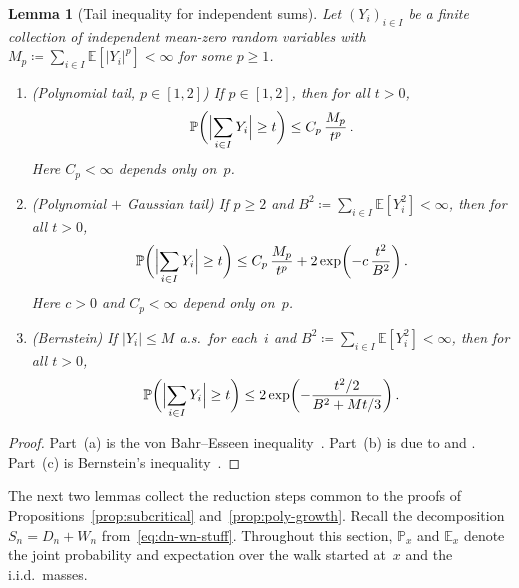 \documentclass[aop]{imsart}
\theoremstyle{plain}
\newtheorem{lemma}[theorem]{Lemma}
\theoremstyle{definition}
\newcommand{\E}{\mathbb{E}}
\renewcommand{\P}{\mathbb{P}}
\begin{document}
	\begin{lemma}[Tail inequality for independent sums]\label{lem:fuk-nagaev}
		Let $(Y_i)_{i\in I}$ be a finite collection of independent mean-zero random variables with $M_p\coloneqq\sum_{i\in I}\E[|Y_i|^p]<\infty$ for some $p\geq 1$.
		\begin{enumerate}[label=\textup{(\alph*)}]
			\item \textup{(Polynomial tail, $p\in[1,2]$)}\; If $p\in[1,2]$, then for all $t>0$,
			\begin{equation}\label{eq:poly-tail}
				\P\biggl(\Bigl|\sum_{i\in I}Y_i\Bigr|\geq t\biggr)\leq C_p\,\frac{M_p}{t^p}\,.
			\end{equation}
			Here $C_p<\infty$ depends only on~$p$.
			\item \textup{(Polynomial $+$ Gaussian tail)}\; If $p\geq 2$ and $B^2\coloneqq\sum_{i\in I}\E[Y_i^2]<\infty$, then for all $t>0$,
			\begin{equation}\label{eq:fuk-nagaev}
				\P\biggl(\Bigl|\sum_{i\in I}Y_i\Bigr|\geq t\biggr)\leq C_p\,\frac{M_p}{t^p}+2\exp\biggl(-c\,\frac{t^2}{B^2}\biggr)\,.
			\end{equation}
			Here $c>0$ and $C_p<\infty$ depend only on~$p$.
			\item \textup{(Bernstein)}\; If $|Y_i|\leq M$ a.s.\ for each~$i$ and $B^2\coloneqq\sum_{i\in I}\E[Y_i^2]<\infty$, then for all $t>0$,
			\begin{equation}\label{eq:bernstein}
				\P\biggl(\Bigl|\sum_{i\in I}Y_i\Bigr|\geq t\biggr)\leq 2\exp\biggl(-\frac{t^2/2}{B^2+Mt/3}\biggr)\,.
			\end{equation}
		\end{enumerate}
	\end{lemma}
	\begin{proof}
		Part~(a) is the von Bahr--Esseen inequality~\citep{vonBahrEsseen65}. Part~(b) is due to \citet{FukNagaev71} and \citet{Nagaev79}. Part~(c) is Bernstein's inequality~\citep[Chapter~III, Theorem~17]{Petrov}.
	\end{proof}
	
	The next two lemmas collect the reduction steps common to the proofs of Propositions~\ref{prop:subcritical} and~\ref{prop:poly-growth}. Recall the decomposition $S_n = D_n + W_n$ from~\eqref{eq:dn-wn-stuff}. Throughout this section, $\P_x$ and $\E_x$ denote the joint probability and expectation over the walk started at~$x$ and the i.i.d.\ masses.
	
\end{document}
